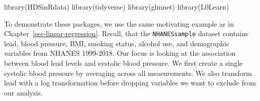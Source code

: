\documentclass[
  letterpaper,
]{latex/krantz}
\makeatletter
\newenvironment{Shaded}{\begin{snugshade}}{\end{snugshade}}
\newcommand{\AttributeTok}[1]{\textcolor[rgb]{0.40,0.45,0.13}{#1}}
\newcommand{\CommentTok}[1]{\textcolor[rgb]{0.37,0.37,0.37}{#1}}
\newcommand{\ConstantTok}[1]{\textcolor[rgb]{0.56,0.35,0.01}{#1}}
\newcommand{\FunctionTok}[1]{\textcolor[rgb]{0.28,0.35,0.67}{#1}}
\newcommand{\NormalTok}[1]{\textcolor[rgb]{0.00,0.23,0.31}{#1}}
\newcommand{\OtherTok}[1]{\textcolor[rgb]{0.00,0.23,0.31}{#1}}
\newcommand{\SpecialCharTok}[1]{\textcolor[rgb]{0.37,0.37,0.37}{#1}}
\newcommand{\StringTok}[1]{\textcolor[rgb]{0.13,0.47,0.30}{#1}}
\newenvironment{kframe}{%
\medskip{}
\setlength{\fboxsep}{.8em}
 \def\at@end@of@kframe{}%
 \ifinner\ifhmode%
  \def\at@end@of@kframe{\end{minipage}}%
  \begin{minipage}{\columnwidth}%
 \fi\fi%
 \def\FrameCommand##1{\hskip\@totalleftmargin \hskip-\fboxsep
 \colorbox{shadecolor}{##1}\hskip-\fboxsep
     \hskip-\linewidth \hskip-\@totalleftmargin \hskip\columnwidth}%
 \MakeFramed {\advance\hsize-\width
   \@totalleftmargin\z@ \linewidth\hsize
   \@setminipage}}%
 {\par\unskip\endMakeFramed%
 \at@end@of@kframe}
\renewenvironment{Shaded}{\begin{kframe}}{\end{kframe}}
\makeatother
\begin{document}
\begin{Shaded}
\begin{Highlighting}[]
\FunctionTok{library}\NormalTok{(HDSinRdata)}
\FunctionTok{library}\NormalTok{(tidyverse)}
\FunctionTok{library}\NormalTok{(glmnet)}
\FunctionTok{library}\NormalTok{(L0Learn)}
\end{Highlighting}
\end{Shaded}

To demonstrate these packages, we use the same motivating example as in
Chapter~\ref{sec-linear-regression}. Recall, that the
\texttt{NHANESsample} dataset
 contains lead, blood
pressure, BMI, smoking status, alcohol use, and demographic variables
from NHANES 1999-2018. Our focus is looking at the association between
blood lead levels and systolic blood pressure. We first create a single
systolic blood pressure by averaging across all measurements. We also
transform lead with a log transformation before dropping variables we
want to exclude from our analysis.

\begin{Shaded}
\end{Shaded}
\end{document}
